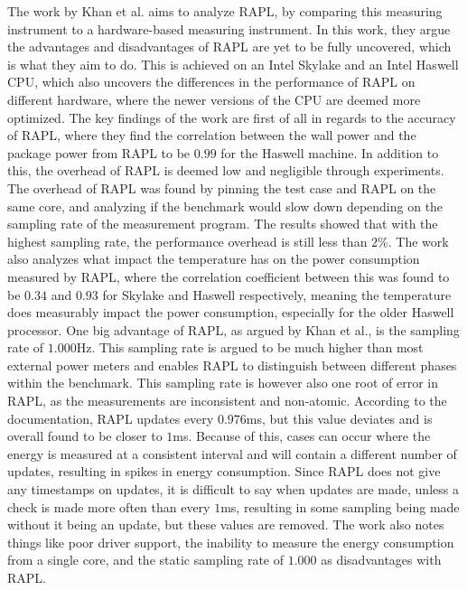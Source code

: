 The work by Khan et al.\cite[]{RAPL_in_action} aims to analyze RAPL, by comparing this measuring instrument to a hardware-based measuring instrument. In this work, they argue the advantages and disadvantages of RAPL are yet to be fully uncovered, which is what they aim to do. This is achieved on an Intel Skylake and an Intel Haswell CPU, which also uncovers the differences in the performance of RAPL on different hardware, where the newer versions of the CPU are deemed more optimized. The key findings of the work are first of all in regards to the accuracy of RAPL, where they find the correlation between the wall power and the package power from RAPL to be $0.99$ for the Haswell machine. In addition to this, the overhead of RAPL is deemed low and negligible through experiments. The overhead of RAPL was found by pinning the test case and RAPL on the same core, and analyzing if the benchmark would slow down depending on the sampling rate of the measurement program. The results showed that with the highest sampling rate, the performance overhead is still less than $2\%$. The work also analyzes what impact the temperature has on the power consumption measured by RAPL, where the correlation coefficient between this was found to be $0.34$ and $0.93$ for Skylake and Haswell respectively, meaning the temperature does measurably impact the power consumption, especially for the older Haswell processor. One big advantage of RAPL, as argued by Khan et al.\cite[]{RAPL_in_action}, is the sampling rate of $1.000$Hz. This sampling rate is argued to be much higher than most external power meters and enables RAPL to distinguish between different phases within the benchmark. This sampling rate is however also one root of error in RAPL, as the measurements are inconsistent and non-atomic. According to the documentation, RAPL updates every $0.976$ms, but this value deviates and is overall found to be closer to $1$ms. Because of this, cases can occur where the energy is measured at a consistent interval and will contain a different number of updates, resulting in spikes in energy consumption. Since RAPL does not give any timestamps on updates, it is difficult to say when updates are made, unless a check is made more often than every $1$ms, resulting in some sampling being made without it being an update, but these values are removed. The work\cite[]{RAPL_in_action} also notes things like poor driver support, the inability to measure the energy consumption from a single core, and the static sampling rate of $1.000$ as disadvantages with RAPL.\cite{RAPL_in_action}\nytafsnit

